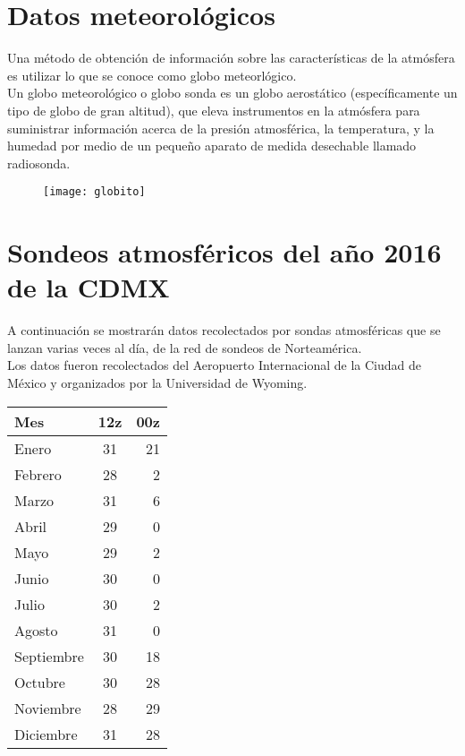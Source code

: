\documentclass[12pt]{article}
\begin{document}
\newpage
\section*{Datos meteorológicos}
Una método de obtención de información sobre las características de la atmósfera es utilizar lo que se conoce como globo meteorlógico. \\
Un globo meteorológico o globo sonda es un globo aerostático (específicamente un tipo de globo de gran altitud), que eleva instrumentos en la atmósfera para suministrar información acerca de la presión atmosférica, la temperatura, y la humedad por medio de un pequeño aparato de medida desechable llamado radiosonda.
\\ 
\begin{figure}[ht]
\texttt{[image: globito]}
\centering
\caption{}
\end{figure}


\newpage



\section*{Sondeos atmosféricos del año 2016 de la CDMX}
A continuación se mostrarán datos recolectados por sondas atmosféricas que se lanzan varias veces al día, de la red de sondeos de Norteamérica. \\
Los datos fueron recolectados  del Aeropuerto Internacional de la Ciudad de México y organizados por la Universidad de Wyoming.

\vspace{0.5 cm}
\centering
\begin{tabular}{|l | c |r | }
\hline
 Mes & 12z & 00z \\ 
\hline
Enero & 31 & 21 \\ 
\hline
Febrero & 28 & 2 \\
\hline
Marzo & 31 & 6 \\
\hline
Abril & 29 & 0 \\
\hline
Mayo & 29 & 2 \\
\hline
Junio & 30 & 0 \\
\hline
Julio & 30 & 2 \\
\hline
Agosto & 31 & 0 \\
\hline
Septiembre & 30 & 18 \\
\hline
Octubre & 30 & 28 \\
\hline
Noviembre & 28 & 29 \\
\hline
Diciembre & 31 & 28 \\
\hline
\end{tabular}
\end{document}
